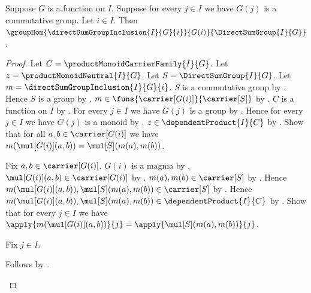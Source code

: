 \begin{theorem}\label{direct_sum_group_inclusion_hom}
    Suppose $G$ is a function on $I$.
    Suppose for every $j\in I$ we have $G(j)$ is a commutative group.
    Let $i\in I$.
    Then
        $\groupHom
            {\directSumGroupInclusion{I}{G}{i}}
            {G(i)}{\DirectSumGroup{I}{G}}$.
\end{theorem}
\begin{proof}
    Let $C=\productMonoidCarrierFamily{I}{G}$.
    Let $z=\productMonoidNeutral{I}{G}$.
    Let $S=\DirectSumGroup{I}{G}$.
    Let $m=\directSumGroupInclusion{I}{G}{i}$.
    $S$ is a commutative group by
        .
    Hence $S$ is a group by .
    $m\in\funs{\carrier[G(i)]}{\carrier[S]}$ by
        .
    $C$ is a function on $I$ by
        .
    For every $j\in I$ we have $G(j)$ is a group by
        .
    Hence for every $j\in I$ we have $G(j)$ is a monoid by
        .
    $z\in\dependentProduct{I}{C}$ by
        .
    Show that for all $a,b\in\carrier[G(i)]$ we have
        $m(\mul[G(i)](a,b))=\mul[S](m(a),m(b))$.
    \begin{subproof}
        Fix $a,b\in\carrier[G(i)]$.
        $G(i)$ is a magma by
            .
        $\mul[G(i)](a,b)\in\carrier[G(i)]$ by
            .
        $m(a),m(b)\in\carrier[S]$ by
            .
        Hence $m(\mul[G(i)](a,b)),\mul[S](m(a),m(b))
            \in\carrier[S]$ by
            .
        Hence $m(\mul[G(i)](a,b)),\mul[S](m(a),m(b))
            \in\dependentProduct{I}{C}$ by
            .
        Show that for every $j\in I$ we have
            $\apply{m(\mul[G(i)](a,b))}{j}
                =\apply{\mul[S](m(a),m(b))}{j}$.
        \begin{subproof}
            Fix $j\in I$.
            \begin{byCase}
                Follows by
                    .

\end{byCase}
\end{subproof}
\end{subproof}
\end{proof}
